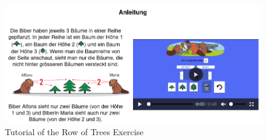 \begin{figure} 
    \centering
    \includegraphics[width=1.0 \columnwidth]{figures/tutorial_example.png}
    \caption{Tutorial of the Row of Trees Exercise} 
    \label{fig:tutorialExample} 
\end{figure}
